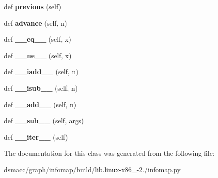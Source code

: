 \begin{DoxyCompactItemize}
def {\bfseries previous} (self)
\item 
\mbox{\label{classinfomap_1_1SwigPyIterator_a3c49da13eef17b0309d4e2693f9423c8}} 
def {\bfseries advance} (self, n)
\item 
\mbox{\label{classinfomap_1_1SwigPyIterator_a2e71dbd50bbeb4d87b64740a49e6812c}} 
def {\bfseries \+\_\+\+\_\+eq\+\_\+\+\_\+} (self, x)
\item 
\mbox{\label{classinfomap_1_1SwigPyIterator_ae1658038a213008faa7c4102ff7a2774}} 
def {\bfseries \+\_\+\+\_\+ne\+\_\+\+\_\+} (self, x)
\item 
\mbox{\label{classinfomap_1_1SwigPyIterator_a5132826176ceda5aca5ac6179283ead0}} 
def {\bfseries \+\_\+\+\_\+iadd\+\_\+\+\_\+} (self, n)
\item 
\mbox{\label{classinfomap_1_1SwigPyIterator_a3f116ea72cf6ef7d8ef6a7f47f12bbdd}} 
def {\bfseries \+\_\+\+\_\+isub\+\_\+\+\_\+} (self, n)
\item 
\mbox{\label{classinfomap_1_1SwigPyIterator_a5bf6ef8ea1bca522d281bcd9bed48b28}} 
def {\bfseries \+\_\+\+\_\+add\+\_\+\+\_\+} (self, n)
\item 
\mbox{\label{classinfomap_1_1SwigPyIterator_abea4a3404320cd2ede3662069144314e}} 
def {\bfseries \+\_\+\+\_\+sub\+\_\+\+\_\+} (self, args)
\item 
\mbox{\label{classinfomap_1_1SwigPyIterator_aaa45edd5da83197787a097ca46093807}} 
def {\bfseries \+\_\+\+\_\+iter\+\_\+\+\_\+} (self)
\end{DoxyCompactItemize}


The documentation for this class was generated from the following file\+:\begin{DoxyCompactItemize}
\item 
dsmacc/graph/infomap/build/lib.\+linux-\/x86\+\_-\/2./infomap.\+py\end{DoxyCompactItemize}
